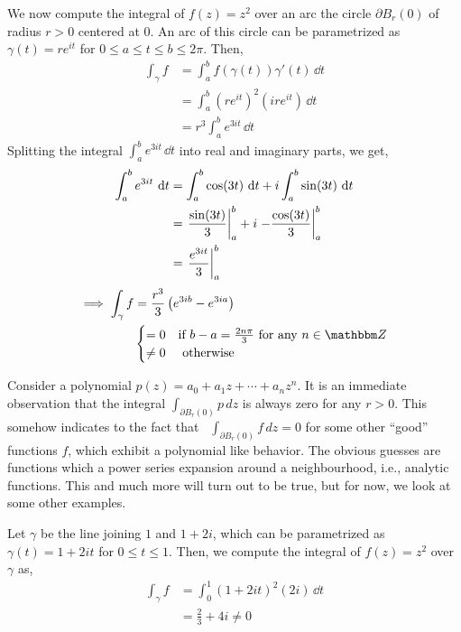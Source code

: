 \documentclass[../ComplexAnalysis_Notes.tex]{subfiles}
\begin{document}
\begin{Eg}{}{}
  We now compute the integral of \(f(z) = z^2\) over an arc the circle \(\partial B_r(0)\) of radius \(r > 0 \) centered at \(0\). An arc of this circle can be parametrized as \(\gamma(t) = re^{it}\) for \(0 \leq a \leq t \leq b \leq 2\pi\). Then,
  \begin{align*}
    \int_\gamma f
     & = \int_a^b f(\gamma(t)) \gamma'(t) \, \dd{t} \\
     & = \int_a^b (re^{it})^2 (ire^{it}) \, \dd{t}  \\
     & = r^3 \int_a^b e^{3it} \, \dd{t}
  \end{align*}
  Splitting the integral \(\int_a^b e^{3it} \, \dd{t}\) into real and imaginary parts, we get,
  \begin{align*}
    \int_a^b e^{3it} \, \dd{t}
     & = \int_a^b \cos(3t) \, \dd{t} + i \int_a^b \sin(3t) \, \dd{t}      \\
     & = \eval{\frac{\sin(3t)}{3}}_a^b + i \eval{-\frac{\cos(3t)}{3}}_a^b \\
     & = \eval{\frac{e^{3it}}{3}}_a^b
  \end{align*}
  \begin{align*}
    \implies\int_\gamma f
     & = \frac{r^3}{3} \left( e^{3ib} - e^{3ia} \right)                      \\
     & \begin{cases}
         = 0    & \text{if } b - a = \frac{2n\pi}{3} \text{ for any } n \in \Z \\
         \neq 0 & \text{ otherwise }
       \end{cases}
  \end{align*}
\end{Eg}

Consider a polynomial \(p(z) = a_0 + a_1 z + \cdots + a_n z^n\). It is an immediate observation that the integral \(\int_{\partial B_r(0)} p\,dz\) is always zero for any \(r > 0\). This somehow indicates to the fact that \ \(\int_{\partial B_r(0)} f \,dz= 0\) for some other ``good'' functions $f$, which exhibit a polynomial like behavior. The obvious guesses are functions which a power series expansion around a neighbourhood, i.e., analytic functions. This and much more will turn out to be true, but for now, we look at some other examples.

\begin{Eg}{}{}
  Let \(\gamma\) be the line joining \(1\) and \(1+2i\), which can be parametrized as \(\gamma(t) = 1 + 2it\) for \(0 \leq t \leq 1\). Then, we compute the integral of \(f(z) = z^2\) over \(\gamma\) as,
  \begin{align*}
    \int_\gamma f
     & = \int_0^1 (1 + 2it)^2 (2i) \, \dd{t} \\
     & = \frac{2}{3} + 4i \neq 0
  \end{align*}
\end{Eg}
\end{document}
